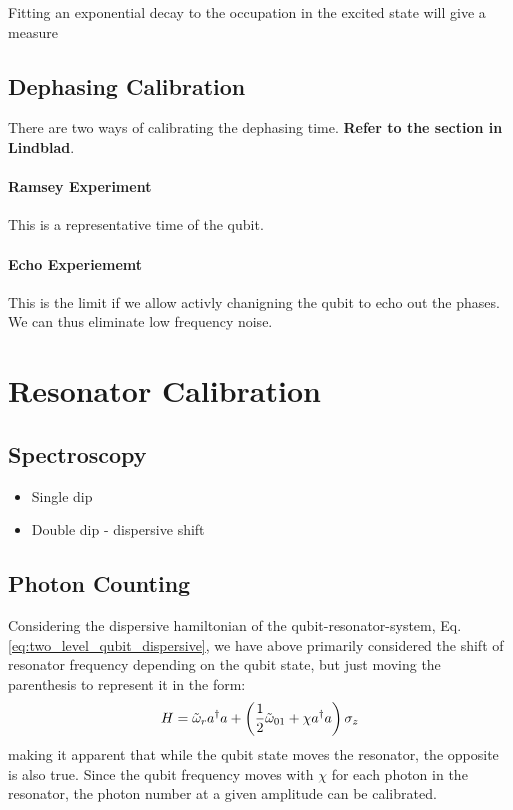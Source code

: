 Fitting an exponential decay to the occupation in the excited state will give a measure 

\subsection{Dephasing Calibration}
There are two ways of calibrating the dephasing time. \textbf{Refer to the section in Lindblad}.

\paragraph{Ramsey Experiment}
This is a representative time of the qubit.

\paragraph{Echo Experiememt}
This is the limit if we allow activly chanigning the qubit to echo out the phases. We can thus eliminate low frequency noise.


\section{Resonator Calibration}
\subsection{Spectroscopy}
\begin{itemize}
    \item Single dip
    \item Double dip - dispersive shift
\end{itemize}

\subsection{Photon Counting}
Considering the dispersive hamiltonian of the qubit-resonator-system, Eq. \ref{eq:two_level_qubit_dispersive}, we have above primarily considered the shift of resonator frequency depending on the qubit state, but just moving the parenthesis to represent it in the form:
\begin{equation}
    H = \Tilde{\omega}_r a^\dagger a  + \left(\frac12 \Tilde{\omega}_{01} + \chi a^\dagger a\right)  \sigma_z
\end{equation}
making it apparent that while the qubit state moves the resonator, the opposite is also true. Since the qubit frequency moves with $\chi$ for each photon in the resonator, the photon number at a given amplitude can be calibrated.  

